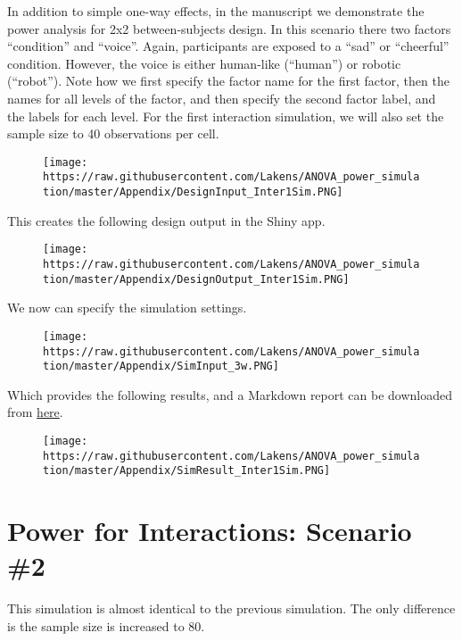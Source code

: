 \documentclass[]{article}
\begin{document}
In addition to simple one-way effects, in the manuscript we demonstrate
the power analysis for 2x2 between-subjects design. In this scenario
there two factors ``condition'' and ``voice''. Again, participants are
exposed to a ``sad'' or ``cheerful'' condition. However, the voice is
either human-like (``human'') or robotic (``robot''). Note how we first
specify the factor name for the first factor, then the names for all
levels of the factor, and then specify the second factor label, and the
labels for each level. For the first interaction simulation, we will
also set the sample size to 40 observations per cell.

\begin{figure}
\centering
\texttt{[image: https://raw.githubusercontent.com/Lakens/ANOVA\_power\_simulation/master/Appendix/DesignInput\_Inter1Sim.PNG]}
\caption{}
\end{figure}

This creates the following design output in the Shiny app.

\begin{figure}
\centering
\texttt{[image: https://raw.githubusercontent.com/Lakens/ANOVA\_power\_simulation/master/Appendix/DesignOutput\_Inter1Sim.PNG]}
\caption{}
\end{figure}

We now can specify the simulation settings.

\begin{figure}
\centering
\texttt{[image: https://raw.githubusercontent.com/Lakens/ANOVA\_power\_simulation/master/Appendix/SimInput\_3w.PNG]}
\caption{}
\end{figure}

Which provides the following results, and a Markdown report can be
downloaded from
\href{https://github.com/Lakens/ANOVA_power_simulation/blob/master/Appendix/Report_3wSim.pdf}{here}.

\begin{figure}
\centering
\texttt{[image: https://raw.githubusercontent.com/Lakens/ANOVA\_power\_simulation/master/Appendix/SimResult\_Inter1Sim.PNG]}
\caption{}
\end{figure}

\section{Power for Interactions: Scenario
\#2}\label{power-for-interactions-scenario-2}

This simulation is almost identical to the previous simulation. The only
difference is the sample size is increased to 80.
\end{document}
